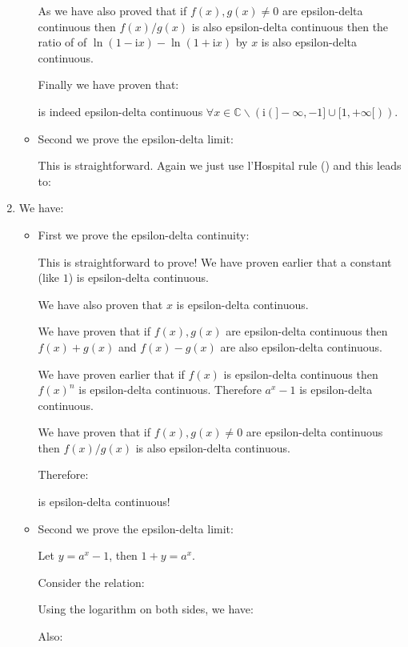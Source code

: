 \begin{enumerate}
\begin{itemize}
			As we have also proved that if $f(x),g(x)\neq 0$ are epsilon-delta continuous then $f(x)/g(x)$ is also epsilon-delta continuous then the ratio of of $\ln (1-\mathrm{i}x)-\ln (1+\mathrm{i} x)$ by $x$ is also epsilon-delta continuous.
			
			Finally we have proven that:
			
			is indeed epsilon-delta continuous $\forall x \in \mathbb{C} \backslash(\mathrm{i}(]-\infty,-1] \cup[1,+\infty[))$.
			
			\item Second we prove the epsilon-delta limit:
			
			This is straightforward. Again we just use l'Hospital rule () and this leads to:
			
		\end{itemize}
		
		\item We have:
		
		
		\begin{itemize}
			\item First we prove the epsilon-delta continuity:
			
			This is straightforward to prove! We have proven earlier that a constant (like $1$) is epsilon-delta continuous.
			
			We have also proven that $x$ is epsilon-delta continuous.
			
			We have proven that if $f(x),g(x)$ are epsilon-delta continuous then $f(x)+ g(x)$ and $f(x)-g(x)$ are  also epsilon-delta continuous. 
			
			We have proven earlier that if $f(x)$ is epsilon-delta continuous then $f(x)^n$ is epsilon-delta continuous. Therefore $a^x-1$ is epsilon-delta continuous. 
			
			We have proven that if $f(x),g(x)\neq 0$ are epsilon-delta continuous then $f(x)/g(x)$ is also epsilon-delta continuous.
			
			Therefore:
			
			is epsilon-delta continuous!
			
			\item Second we prove the epsilon-delta limit:
			
			Let $y=a^x-1$, then $1+y=a^x$.
			
			Consider the relation:
			
			Using the logarithm on both sides, we have:
			
			Also:
			

\end{itemize}
\end{enumerate}
